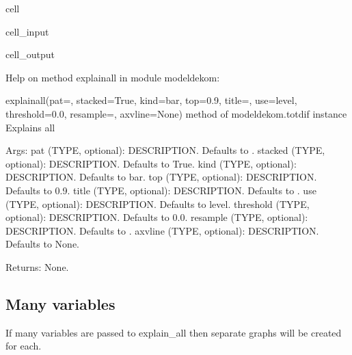 \documentclass[letterpaper,10pt,english]{jupyterBook}
\begin{document}
\begin{sphinxuseclass}{cell}\begin{sphinxVerbatimInput}

\begin{sphinxuseclass}{cell_input}
\begin{sphinxVerbatim}[commandchars=\\\{\}]
\end{sphinxVerbatim}

\end{sphinxuseclass}\end{sphinxVerbatimInput}
\begin{sphinxVerbatimOutput}

\begin{sphinxuseclass}{cell_output}
\begin{sphinxVerbatim}[commandchars=\\\{\}]
Help on method explain\PYGZus{}all in module modeldekom:

explain\PYGZus{}all(pat=\PYGZsq{}\PYGZsq{}, stacked=True, kind=\PYGZsq{}bar\PYGZsq{}, top=0.9, title=\PYGZsq{}\PYGZsq{}, use=\PYGZsq{}level\PYGZsq{}, threshold=0.0, resample=\PYGZsq{}\PYGZsq{}, axvline=None) method of modeldekom.totdif instance
    Explains all
    
    Args:
        pat (TYPE, optional): DESCRIPTION. Defaults to \PYGZsq{}\PYGZsq{}.
        stacked (TYPE, optional): DESCRIPTION. Defaults to True.
        kind (TYPE, optional): DESCRIPTION. Defaults to \PYGZsq{}bar\PYGZsq{}.
        top (TYPE, optional): DESCRIPTION. Defaults to 0.9.
        title (TYPE, optional): DESCRIPTION. Defaults to \PYGZsq{}\PYGZsq{}.
        use (TYPE, optional): DESCRIPTION. Defaults to \PYGZsq{}level\PYGZsq{}.
        threshold (TYPE, optional): DESCRIPTION. Defaults to 0.0.
        resample (TYPE, optional): DESCRIPTION. Defaults to \PYGZsq{}\PYGZsq{}.
        axvline (TYPE, optional): DESCRIPTION. Defaults to None.
    
    Returns:
        None.
\end{sphinxVerbatim}

\end{sphinxuseclass}\end{sphinxVerbatimOutput}

\end{sphinxuseclass}

\subsection{Many variables}
\label{\detokenize{content/06_ModelAnalytics/AttributionSomeFeatures:many-variables}}
\sphinxAtStartPar
If many variables are passed to explain\_all then separate graphs will be created for each.
\end{document}
